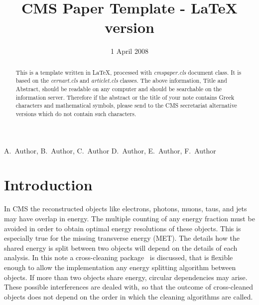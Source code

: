 \documentclass{cmspaper}
\begin{document}

\begin{titlepage}

   \date{1 April 2008}

  \title{CMS Paper Template - LaTeX version}

  \begin{Authlist}
    A.~Author, B.~Author, C.~Author
    D.~Author, E.~Author, F.~Author
  \end{Authlist}



  \begin{abstract}
    This is a template written in LaTeX,
    processed with {\it cmspaper.cls} document class.
    It is based on the {\it cernart.cls} and {\it articlet.cls} classes.
    The above information, Title and Abstract, should be readable on any 
    computer and should be searchable on the information server. 
    Therefore if the abstract or the title of your note contains Greek 
    characters and mathematical symbols, please send to the CMS secretariat 
    alternative versions which do not contain such characters.
  \end{abstract} 

  
\end{titlepage}

\setcounter{page}{2}%


\section{Introduction}
In CMS the reconstructed objects like electrons, photons, muons, taus, and jets
may have overlap in energy. The multiple counting of any energy fraction must be
avoided in order to obtain optimal energy resolutions of these objects. This is
especially true for the missing transverse energy (MET). The details how the
shared energy is split between two objects will depend on the details of each
analysis. In this note a cross-cleaning package~\cite{package} is discussed,
that is flexible enough to allow the implementation any energy splitting
algorithm between objects. If more than two objects share energy, circular
dependencies may arise. These possible interferences are dealed with, so that
the outcome of cross-cleaned objects does not depend on the order in which the
cleaning algorithms are called.
\end{document}

